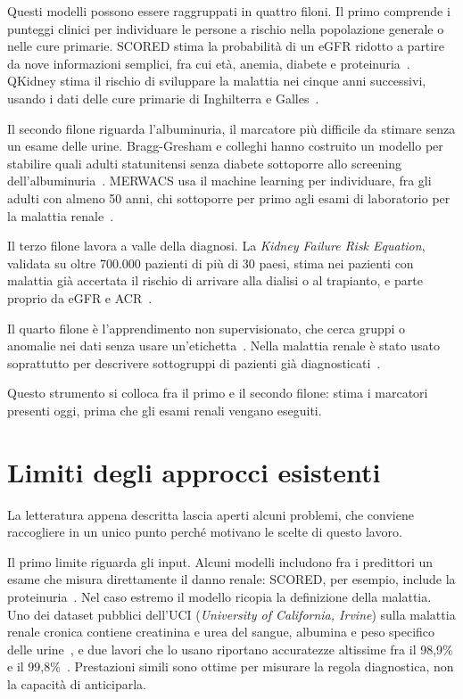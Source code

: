 \documentclass[a4paper, 12pt, oneside]{book}
\begin{document}
Questi modelli possono essere raggruppati in quattro filoni. Il primo comprende i punteggi clinici per individuare le persone a rischio nella popolazione generale o nelle cure primarie. SCORED stima la probabilità di un eGFR ridotto a partire da nove informazioni semplici, fra cui età, anemia, diabete e proteinuria~\cite{bang_screening_2007}. QKidney stima il rischio di sviluppare la malattia nei cinque anni successivi, usando i dati delle cure primarie di Inghilterra e Galles~\cite{hippisley-cox_predicting_2010}.

Il secondo filone riguarda l'albuminuria, il marcatore più difficile da stimare senza un esame delle urine. Bragg-Gresham e colleghi hanno costruito un modello per stabilire quali adulti statunitensi senza diabete sottoporre allo screening dell'albuminuria~\cite{bragg-gresham_using_2025}. MERWACS usa il machine learning per individuare, fra gli adulti con almeno 50 anni, chi sottoporre per primo agli esami di laboratorio per la malattia renale~\cite{yoo_merwacs_2026}.

Il terzo filone lavora a valle della diagnosi. La \textit{Kidney Failure Risk Equation}, validata su oltre 700.000 pazienti di più di 30 paesi, stima nei pazienti con malattia già accertata il rischio di arrivare alla dialisi o al trapianto, e parte proprio da eGFR e ACR~\cite{tangri_multinational_2016}.

Il quarto filone è l'apprendimento non supervisionato, che cerca gruppi o anomalie nei dati senza usare un'etichetta~\cite{hastie_elements_2009,beam_big_2018}. Nella malattia renale è stato usato soprattutto per descrivere sottogruppi di pazienti già diagnosticati~\cite{zheng_subtyping_2021}.

Questo strumento si colloca fra il primo e il secondo filone: stima i marcatori presenti oggi, prima che gli esami renali vengano eseguiti.

\section{Limiti degli approcci esistenti}
La letteratura appena descritta lascia aperti alcuni problemi, che conviene raccogliere in un unico punto perché motivano le scelte di questo lavoro.

Il primo limite riguarda gli input. Alcuni modelli includono fra i predittori un esame che misura direttamente il danno renale: SCORED, per esempio, include la proteinuria~\cite{bang_screening_2007}. Nel caso estremo il modello ricopia la definizione della malattia. Uno dei dataset pubblici dell'UCI (\textit{University of California, Irvine}) sulla malattia renale cronica contiene creatinina e urea del sangue, albumina e peso specifico delle urine~\cite{l_rubini_chronic_2015}, e due lavori che lo usano riportano accuratezze altissime fra il 98,9\% e il 99,8\%~\cite{qin_machine_2020,chittora_prediction_2021}. Prestazioni simili sono ottime per misurare la regola diagnostica, non la capacità di anticiparla.
\end{document}

